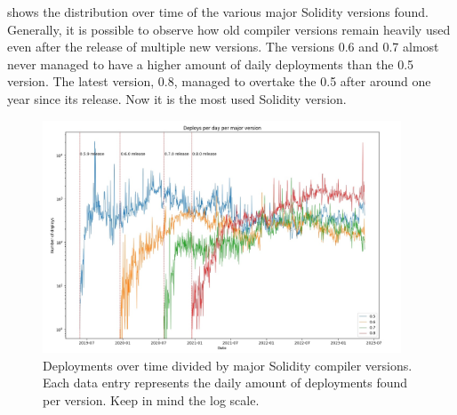  shows the distribution over time of the various major Solidity versions found. 
Generally, it is possible to observe how old compiler versions remain heavily used even after the release of multiple new versions.
The versions 0.6 and 0.7 almost never managed to have a higher amount of daily deployments than the 0.5 version.
The latest version, 0.8, managed to overtake the 0.5 after around one year since its release. Now it is the most used Solidity version.

\begin{figure}[ht]
    \centering
    \includegraphics[width=0.95\textwidth]{Figures/analysis/deploys_per_day_per_major.jpg}
    \caption{Deployments over time divided by major Solidity compiler versions. Each data entry represents the daily amount of deployments found per version. Keep in mind the log scale.}
    \label{fig:deploys-per-solidity-version}
\end{figure}




